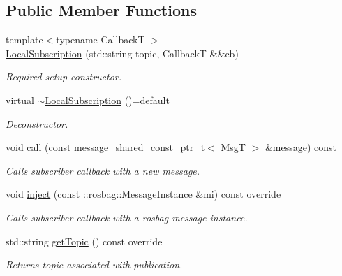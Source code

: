 \subsection*{Public Member Functions}
\begin{DoxyCompactItemize}
\item 
{\footnotesize template$<$typename CallbackT $>$ }\\\hyperlink{classflow__ros_1_1routing_1_1_local_subscription_a1237291e8d1b96fc53dfbdd8f03c7b41}{Local\+Subscription} (std\+::string topic, CallbackT \&\&cb)
\begin{DoxyCompactList}\small\item\em Required setup constructor. \end{DoxyCompactList}\item 
\mbox{\label{classflow__ros_1_1routing_1_1_local_subscription_a606df699668ffed88b4957647e014369}} 
virtual \hyperlink{classflow__ros_1_1routing_1_1_local_subscription_a606df699668ffed88b4957647e014369}{$\sim$\+Local\+Subscription} ()=default
\begin{DoxyCompactList}\small\item\em Deconstructor. \end{DoxyCompactList}\item 
void \hyperlink{classflow__ros_1_1routing_1_1_local_subscription_add75c608907362a9e7f808fd15c3ff06}{call} (const \hyperlink{namespaceflow__ros_ad222b6c2bd0341c551129c3a03241ad7}{message\+\_\+shared\+\_\+const\+\_\+ptr\+\_\+t}$<$ MsgT $>$ \&message) const
\begin{DoxyCompactList}\small\item\em Calls subscriber callback with a new message. \end{DoxyCompactList}\item 
void \hyperlink{classflow__ros_1_1routing_1_1_local_subscription_a55ebb76a250f8d45a7fb95d58431c816}{inject} (const \+::rosbag\+::\+Message\+Instance \&mi) const override
\begin{DoxyCompactList}\small\item\em Calls subscriber callback with a rosbag message instance. \end{DoxyCompactList}\item 
std\+::string \hyperlink{classflow__ros_1_1routing_1_1_local_subscription_a24b7dabe9dcabb93339848ae1f8dc57d}{get\+Topic} () const override
\begin{DoxyCompactList}\small\item\em Returns topic associated with publication. \end{DoxyCompactList}\item 

\end{DoxyCompactItemize}
